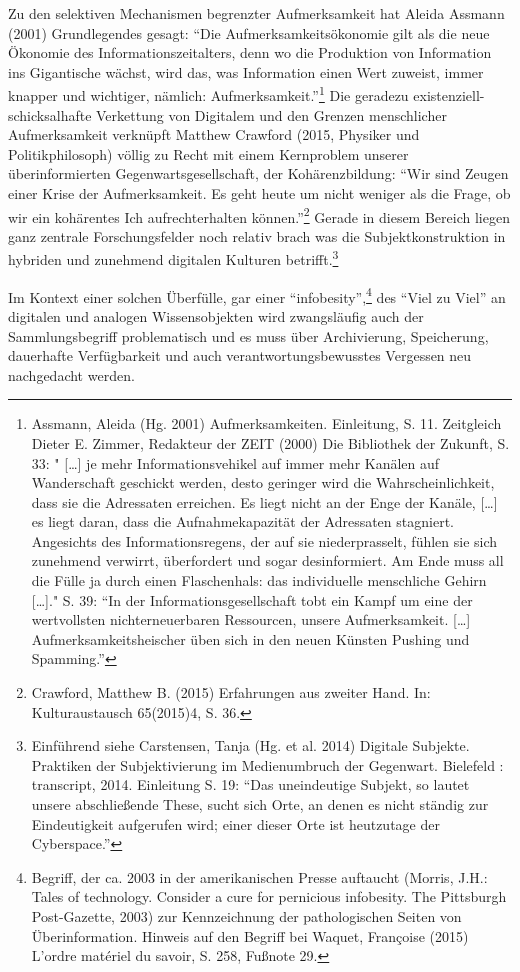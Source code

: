 \documentclass[a4paper,
fontsize=11pt,
oneside,
numbers=noperiodatend,
parskip=half-,
bibliography=totoc,
final
]{scrartcl}
\begin{document}
Zu den selektiven Mechanismen begrenzter Aufmerksamkeit hat Aleida
Assmann (2001) Grundlegendes gesagt: \enquote{Die
Aufmerksamkeitsökonomie gilt als die neue Ökonomie des
Informationszeitalters, denn wo die Produktion von Information ins
Gigantische wächst, wird das, was Information einen Wert zuweist, immer
knapper und wichtiger, nämlich: Aufmerksamkeit.}\footnote{Assmann,
  Aleida (Hg. 2001) Aufmerksamkeiten. Einleitung, S. 11. Zeitgleich
  Dieter E. Zimmer, Redakteur der ZEIT (2000) Die Bibliothek der
  Zukunft, S. 33: " {[}\ldots{}{]} je mehr Informationsvehikel auf immer
  mehr Kanälen auf Wanderschaft geschickt werden, desto geringer wird
  die Wahrscheinlichkeit, dass sie die Adressaten erreichen. Es liegt
  nicht an der Enge der Kanäle, {[}\ldots{}{]} es liegt daran, dass die
  Aufnahmekapazität der Adressaten stagniert. Angesichts des
  Informationsregens, der auf sie niederprasselt, fühlen sie sich
  zunehmend verwirrt, überfordert und sogar desinformiert. Am Ende muss
  all die Fülle ja durch einen Flaschenhals: das individuelle
  menschliche Gehirn {[}\ldots{}{]}." S. 39: \enquote{In der
  Informationsgesellschaft tobt ein Kampf um eine der wertvollsten
  nichterneuerbaren Ressourcen, unsere Aufmerksamkeit. {[}\ldots{}{]}
  Aufmerksamkeitsheischer üben sich in den neuen Künsten Pushing und
  Spamming.}} Die geradezu existenziell-schicksalhafte Verkettung von
Digitalem und den Grenzen menschlicher Aufmerksamkeit verknüpft Matthew
Crawford (2015, Physiker und Politikphilosoph) völlig zu Recht mit einem
Kernproblem unserer überinformierten Gegenwartsgesellschaft, der
Kohärenzbildung: \enquote{Wir sind Zeugen einer Krise der
Aufmerksamkeit. Es geht heute um nicht weniger als die Frage, ob wir ein
kohärentes Ich aufrechterhalten können.}\footnote{Crawford, Matthew B.
  (2015) Erfahrungen aus zweiter Hand. In: Kulturaustausch 65(2015)4, S.
  36.} Gerade in diesem Bereich liegen ganz zentrale Forschungsfelder
noch relativ brach was die Subjektkonstruktion in hybriden und zunehmend
digitalen Kulturen betrifft.\footnote{Einführend siehe Carstensen, Tanja
  (Hg. et al. 2014) Digitale Subjekte. Praktiken der Subjektivierung im
  Medienumbruch der Gegenwart. Bielefeld : transcript, 2014. Einleitung
  S. 19: \enquote{Das uneindeutige Subjekt, so lautet unsere
  abschließende These, sucht sich Orte, an denen es nicht ständig zur
  Eindeutigkeit aufgerufen wird; einer dieser Orte ist heutzutage der
  Cyberspace.}}

Im Kontext einer solchen Überfülle, gar einer
\enquote{infobesity},\footnote{Begriff, der ca. 2003 in der
  amerikanischen Presse auftaucht (Morris, J.H.: Tales of technology.
  Consider a cure for pernicious infobesity. The Pittsburgh
  Post-Gazette, 2003) zur Kennzeichnung der pathologischen Seiten von
  Überinformation. Hinweis auf den Begriff bei Waquet, Françoise (2015)
  L'ordre matériel du savoir, S. 258, Fußnote 29.} des \enquote{Viel zu
Viel} an digitalen und analogen Wissensobjekten wird zwangsläufig auch
der Sammlungsbegriff problematisch und es muss über Archivierung,
Speicherung, dauerhafte Verfügbarkeit und auch verantwortungsbewusstes
Vergessen neu nachgedacht werden.
\end{document}
